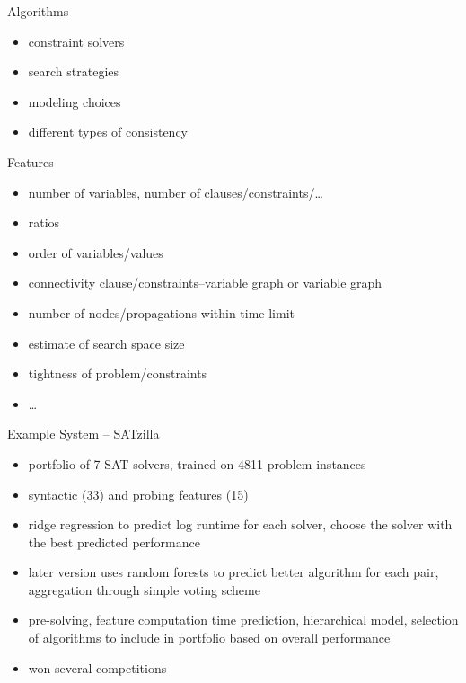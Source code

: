 \begin{frame}[c]{Algorithms }
    \begin{itemize}
        \item constraint solvers
        \item search strategies
        \item modeling choices
        \item different types of consistency
    \end{itemize}
\end{frame}

\begin{frame}[c]{Features}
    \begin{itemize}
        \item number of variables, number of clauses/constraints/\ldots
        \item ratios
        \item order of variables/values
        \item connectivity clause/constraints--variable graph or variable graph
        \item number of nodes/propagations within time limit
        \item estimate of search space size
        \item tightness of problem/constraints
        \item \ldots
    \end{itemize}
\end{frame}

\begin{frame}[c]{Example System -- SATzilla }
\begin{itemize}
\item portfolio of 7 SAT solvers, trained on 4811 problem instances
\item syntactic (33) and probing features (15)
\item ridge regression to predict log runtime for each solver, choose the solver with the best predicted performance
\item later version uses random forests to predict better algorithm for each
 pair, aggregation through simple voting scheme
\item pre-solving, feature computation time prediction, hierarchical model,
selection of algorithms to include in portfolio based on overall performance
\item won several competitions
\end{itemize}
\end{frame}

